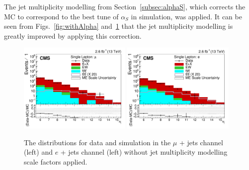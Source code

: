 The jet multiplicity modelling from Section~\ref{subsec:alphaS}, which corrects the MC to correspond to the best tune of $\alpha_S$ in simulation, was applied. It can be seen from Figs.~\ref{fig:withAlpha} and~\ref{fig:withoutAlpha} that the jet multiplicity modelling is greatly improved by applying this correction.

\begin{figure}[]
    \includegraphics[width=0.48\textwidth]{images/Run2/nJets_StackLogY_woAlphaS.pdf}
    \includegraphics[width=0.48\textwidth]{images/Run2/nJets_StackLogY_e_woAlphaS.pdf}
    \caption{The \njets distributions for data and simulation in the $\mu$ + jets channel (left) and $e$ + jets channel (left) without jet multiplicity modelling scale factors applied.}
    \label{fig:withoutAlpha}
\end{figure}

